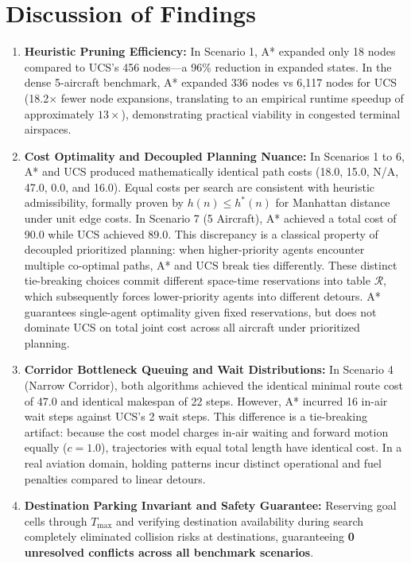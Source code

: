 \documentclass[11pt,a4paper]{article}
\begin{document}
\section{Discussion of Findings}
\begin{enumerate}
    \item \textbf{Heuristic Pruning Efficiency:} In Scenario 1, A* expanded only 18 nodes compared to UCS's 456 nodes—a 96\% reduction in expanded states. In the dense 5-aircraft benchmark, A* expanded 336 nodes vs 6,117 nodes for UCS (18.2$\times$ fewer node expansions, translating to an empirical runtime speedup of approximately $13\times$), demonstrating practical viability in congested terminal airspaces.
    \item \textbf{Cost Optimality and Decoupled Planning Nuance:} In Scenarios 1 to 6, A* and UCS produced mathematically identical path costs (18.0, 15.0, N/A, 47.0, 0.0, and 16.0). Equal costs per search are consistent with heuristic admissibility, formally proven by $h(n) \le h^*(n)$ for Manhattan distance under unit edge costs. In Scenario 7 (5 Aircraft), A* achieved a total cost of 90.0 while UCS achieved 89.0. This discrepancy is a classical property of decoupled prioritized planning: when higher-priority agents encounter multiple co-optimal paths, A* and UCS break ties differently. These distinct tie-breaking choices commit different space-time reservations into table $\mathcal{R}$, which subsequently forces lower-priority agents into different detours. A* guarantees single-agent optimality given fixed reservations, but does not dominate UCS on total joint cost across all aircraft under prioritized planning.
    \item \textbf{Corridor Bottleneck Queuing and Wait Distributions:} In Scenario 4 (Narrow Corridor), both algorithms achieved the identical minimal route cost of 47.0 and identical makespan of 22 steps. However, A* incurred 16 in-air wait steps against UCS's 2 wait steps. This difference is a tie-breaking artifact: because the cost model charges in-air waiting and forward motion equally ($c=1.0$), trajectories with equal total length have identical cost. In a real aviation domain, holding patterns incur distinct operational and fuel penalties compared to linear detours.
    \item \textbf{Destination Parking Invariant and Safety Guarantee:} Reserving goal cells through $T_{\max}$ and verifying destination availability during search completely eliminated collision risks at destinations, guaranteeing \textbf{0 unresolved conflicts across all benchmark scenarios}.

\end{enumerate}
\end{document}

